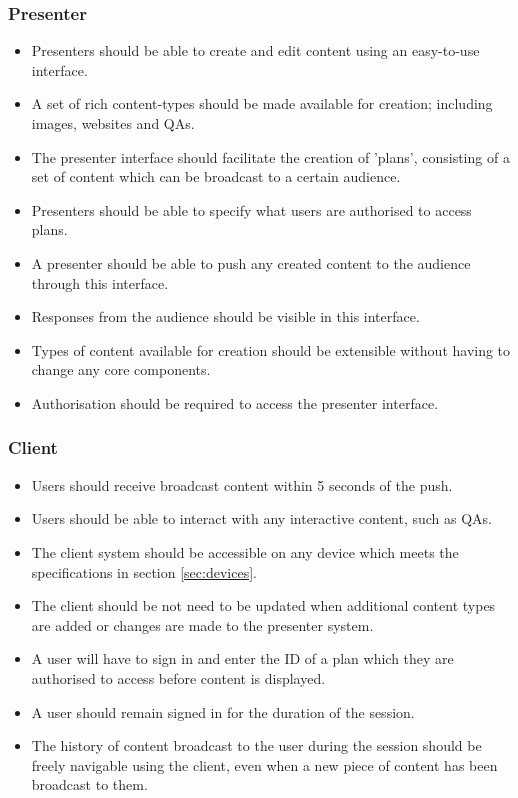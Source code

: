 \documentclass[a4papert,11pt,notitlepage]{ltxdoc}
\begin{document}
\subsubsection{Presenter}
\begin{itemize}
\item Presenters should be able to create and edit content using an easy-to-use interface.
\item A set of rich content-types should be made available for creation; including images, websites and QAs.
\item The presenter interface should facilitate the creation of 'plans', consisting of a set of content which can be broadcast to a certain audience.
\item Presenters should be able to specify what users are authorised to access plans.
\item A presenter should be able to push any created content to the audience through this interface.
\item Responses from the audience should be visible in this interface.
\item Types of content available for creation should be extensible without having to change any core components.
\item Authorisation should be required to access the presenter interface.
\end{itemize}
\subsubsection{Client}
\begin{itemize}
\item Users should receive broadcast content within 5 seconds of the push.
\item Users should be able to interact with any interactive content, such as QAs.
\item The client system should be accessible on any device which meets the specifications in section \ref{sec:devices}.
\item The client should be not need to be updated when additional content types are added or changes are made to the presenter system.
\item A user will have to sign in and enter the ID of a plan which they are authorised to access before content is displayed.
\item A user should remain signed in for the duration of the session.
\item The history of content broadcast to the user during the session should be freely navigable using the client, even when a new piece of content has been broadcast to them.
\end{itemize}
\end{document}
